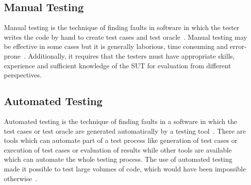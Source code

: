\subsection{Manual Testing}
Manual testing is the technique of finding faults in software in which the tester writes the code by hand to create test cases and test oracle~\cite{Ciupa2008}. Manual testing may be effective in some cases but it is generally laborious, time consuming and error-prone~\cite{tretmans1999}. Additionally, it requires that the testers must have appropriate skills, experience and sufficient knowledge of the SUT for evaluation from different perspectives.
 
\subsection{Automated Testing}
Automated testing is the technique of finding faults in a software in which the test cases or test oracle are generated automatically by a testing tool~\cite{Leitner2007}. There are tools which can automate part of a test process like generation of test cases or execution of test cases or evaluation of results while other tools are available which can automate the whole testing process. The use of automated testing made it possible to test large volumes of code, which would have been impossible otherwise~\cite{ramamoorthy1975testing}.

